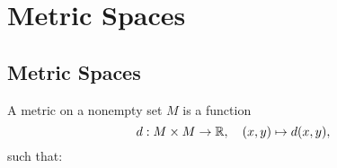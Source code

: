 \chapter{Metric Spaces}\label{chp:metric-spaces}

\section{Metric Spaces}\label{sec:metric-spaces}

\begin{definition}\label{def:metric-space}
  A metric on a nonempty set \(M\) is a function
  \[
    d:M\times{M}\to\mathbb{R},\quad{(x,y)\mapsto{d(x,y)}},
  \]
  such that:
\end{definition}


